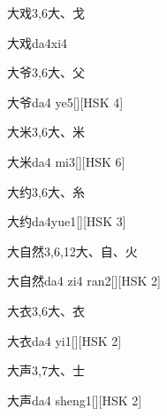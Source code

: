 \begin{entry}{大戏}{3,6}{⼤、⼽}
  \begin{phonetics}{大戏}{da4xi4}
  \end{phonetics}
\end{entry}

\begin{entry}{大爷}{3,6}{⼤、⽗}
  \begin{phonetics}{大爷}{da4 ye5}[][HSK 4]
  \end{phonetics}
\end{entry}

\begin{entry}{大米}{3,6}{⼤、⽶}
  \begin{phonetics}{大米}{da4 mi3}[][HSK 6]
  \end{phonetics}
\end{entry}

\begin{entry}{大约}{3,6}{⼤、⽷}
  \begin{phonetics}{大约}{da4yue1}[][HSK 3]
  \end{phonetics}
\end{entry}

\begin{entry}{大自然}{3,6,12}{⼤、⾃、⽕}
  \begin{phonetics}{大自然}{da4 zi4 ran2}[][HSK 2]
  \end{phonetics}
\end{entry}

\begin{entry}{大衣}{3,6}{⼤、⾐}
  \begin{phonetics}{大衣}{da4 yi1}[][HSK 2]
  \end{phonetics}
\end{entry}

\begin{entry}{大声}{3,7}{⼤、⼠}
  \begin{phonetics}{大声}{da4 sheng1}[][HSK 2]
  \end{phonetics}
\end{entry}

